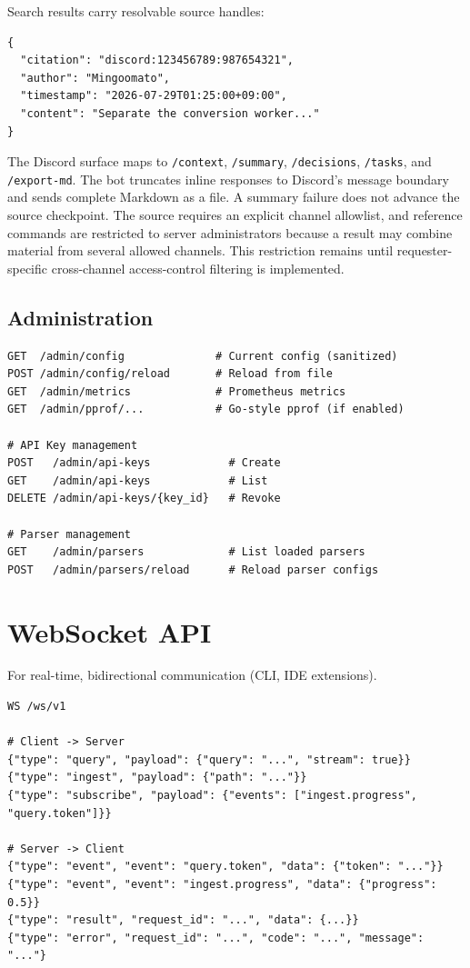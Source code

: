 Search results carry resolvable source handles:

\begin{verbatim}
{
  "citation": "discord:123456789:987654321",
  "author": "Mingoomato",
  "timestamp": "2026-07-29T01:25:00+09:00",
  "content": "Separate the conversion worker..."
}
\end{verbatim}

The Discord surface maps to
\texttt{/context}, \texttt{/summary}, \texttt{/decisions},
\texttt{/tasks}, and \texttt{/export-md}. The bot truncates inline responses to
Discord's message boundary and sends complete Markdown as a file. A summary
failure does not advance the source checkpoint. The source requires an explicit
channel allowlist, and reference commands are restricted to server
administrators because a result may combine material from several allowed
channels. This restriction remains until requester-specific cross-channel
access-control filtering is implemented.

\subsection{Administration}
\label{sec:api:admin}

\begin{verbatim}
GET  /admin/config              # Current config (sanitized)
POST /admin/config/reload       # Reload from file
GET  /admin/metrics             # Prometheus metrics
GET  /admin/pprof/...           # Go-style pprof (if enabled)

# API Key management
POST   /admin/api-keys            # Create
GET    /admin/api-keys            # List
DELETE /admin/api-keys/{key_id}   # Revoke

# Parser management
GET    /admin/parsers             # List loaded parsers
POST   /admin/parsers/reload      # Reload parser configs
\end{verbatim}

\section{WebSocket API}
\label{sec:api:ws}

For real-time, bidirectional communication (CLI, IDE extensions).

\begin{verbatim}
WS /ws/v1

# Client -> Server
{"type": "query", "payload": {"query": "...", "stream": true}}
{"type": "ingest", "payload": {"path": "..."}}
{"type": "subscribe", "payload": {"events": ["ingest.progress", "query.token"]}}

# Server -> Client
{"type": "event", "event": "query.token", "data": {"token": "..."}}
{"type": "event", "event": "ingest.progress", "data": {"progress": 0.5}}
{"type": "result", "request_id": "...", "data": {...}}
{"type": "error", "request_id": "...", "code": "...", "message": "..."}
\end{verbatim}

